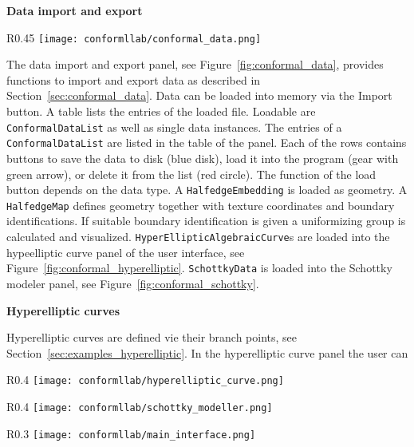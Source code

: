 \documentclass[Thesis.tex]{subfiles}
\begin{document}
{\bf Data import and export}

\begin{wrapfigure}{R}{0.45\textwidth}
\centering
\texttt{[image: conformllab/conformal\_data.png]}
\caption{XML data import and export interface of {\sc ConformalLab}.}
\label{fig:conformal_data}
\end{wrapfigure}
The data import and export panel, see Figure~\ref{fig:conformal_data},
provides functions to import and export data as described in Section~\ref{sec:conformal_data}.
Data can be loaded into memory via the Import button. A table lists the entries of the loaded file.
Loadable are {\tt ConformalDataList} as well as single data instances. The entries of a
{\tt ConformalDataList} are listed in the table of the panel. Each of the rows contains buttons
to save the data to disk (blue disk), load it into the program (gear with green arrow), or delete 
it from the list (red circle).
The function of the load button depends on the data type. A {\tt HalfedgeEmbedding} is
loaded as geometry. A {\tt HalfedgeMap} defines geometry together with texture coordinates
and boundary identifications. If suitable boundary identification is given a uniformizing
group is calculated and visualized. {\tt HyperEllipticAlgebraicCurve}s are loaded into 
the hypeelliptic curve panel of the user interface, see Figure~\ref{fig:conformal_hyperelliptic}. 
{\tt SchottkyData} is loaded into the Schottky modeler panel, see Figure~\ref{fig:conformal_schottky}.

{\bf Hyperelliptic curves}

Hyperelliptic curves are defined vie their branch points, see Section~\ref{sec:examples_hyperelliptic}.
In the hyperelliptic curve panel the user can 

\begin{wrapfigure}{R}{0.4\textwidth}
\centering
\texttt{[image: conformllab/hyperelliptic\_curve.png]}
\caption{Hyperelliptic curve interface of {\sc ConformalLab}.}
\label{fig:conformal_hyperelliptic}
\end{wrapfigure}

\begin{wrapfigure}{R}{0.4\textwidth}
\centering
\texttt{[image: conformllab/schottky\_modeller.png]}
\caption{The Schottky modeler user interface of {\sc ConformalLab}.}
\label{fig:conformal_schottky}
\end{wrapfigure}

\begin{wrapfigure}{R}{0.3\textwidth}
\centering
\texttt{[image: conformllab/main\_interface.png]}
\caption{The main interface of {\sc ConformalLab}.}
\label{fig:conformal_main}
\end{wrapfigure}



\subfilebibliography
\end{document}
